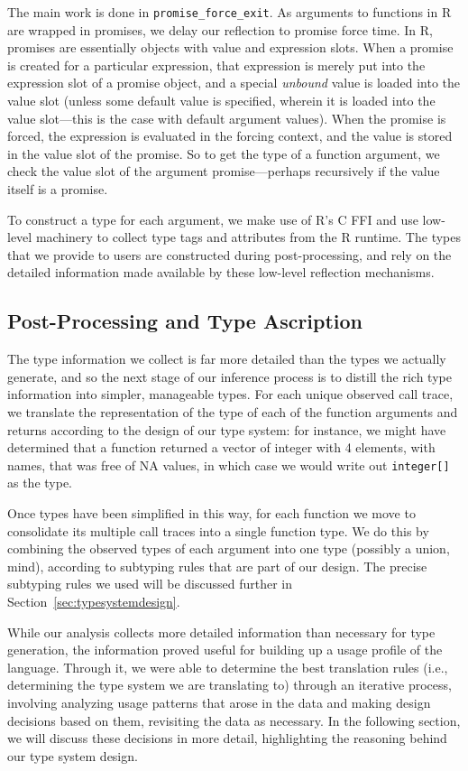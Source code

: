 \documentclass[acmsmall,review,anonymous]{acmart}\settopmatter{printfolios=true,printccs=false,printacmref=false}
\newcommand{\code}[1]{{\lstinline[style=Rin]!#1!}\xspace}
\begin{document}
The main work is done in {\tt promise\_force\_exit}.
As arguments to functions in R are wrapped in promises, we delay our reflection to promise force time.
In R, promises are essentially objects with value and expression slots.
When a promise is created for a particular expression, that expression is merely put into the expression slot of a promise object, and a special {\it unbound} value is loaded into the value slot (unless some default value is specified, wherein it is loaded into the value slot---this is the case with default argument values).
When the promise is forced, the expression is evaluated in the forcing context, and the value is stored in the value slot of the promise.
So to get the type of a function argument, we check the value slot of the argument promise---perhaps recursively if the value itself is a promise.

To construct a type for each argument, we make use of R's C FFI and use low-level machinery to collect type tags and attributes from the R runtime.
The types that we provide to users are constructed during post-processing, and rely on the detailed information made available by these low-level reflection mechanisms.

%
%
%
%
\subsection{Post-Processing and Type Ascription}

The type information we collect is far more detailed than the types we actually generate, and so the next stage of our inference process is to distill the rich type information into simpler, manageable types.
For each unique observed call trace, we translate the representation of the type of each of the function arguments and returns according to the design of our type system:
for instance, we might have determined that a function returned a vector of integer with 4 elements, with names, that was free of NA values, in which case we would write out \code{integer[]} as the type.

Once types have been simplified in this way, for each function we move to consolidate its multiple call traces into a single function type.
We do this by combining the observed types of each argument into one type (possibly a union, mind), according to subtyping rules that are part of our design.
The precise subtyping rules we used will be discussed further in Section~\ref{sec:typesystemdesign}.

While our analysis collects more detailed information than necessary for type generation, the information proved useful for building up a usage profile of the language. Through it, we were able to determine the best translation rules (i.e., determining the type system we are translating to) through an iterative process, involving analyzing usage patterns that arose in the data and making design decisions based on them, revisiting the data as necessary.
In the following section, we will discuss these decisions in more detail, highlighting the reasoning behind our type system design.
\end{document}
